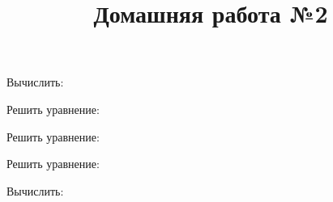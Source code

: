 \newpage
\title{Домашняя работа №2}
\begin{listofex}
	\item Вычислить:
	\begin{enumcols}[itemcolumns=2]
		\item {}
		\item {}
	\end{enumcols}
	\item Решить уравнение:
	\begin{enumcols}[itemcolumns=1]
		\item {}
		\item {}
		\item {}
		\item {}
	\end{enumcols}
	\item Решить уравнение:
	\begin{enumcols}[itemcolumns=2]
		\item {}
		\item {}
		\item {}
	\end{enumcols}
	\item Решить уравнение:
	\begin{enumcols}[itemcolumns=2]
		\item {}
		\item {}
		\item {}
		\item {}
	\end{enumcols}
	\item {}
	\item Вычислить:
	\begin{enumcols}[itemcolumns=1]
		\item {}
		\item {}
		\item {}
		\item {}
	\end{enumcols}
\end{listofex}